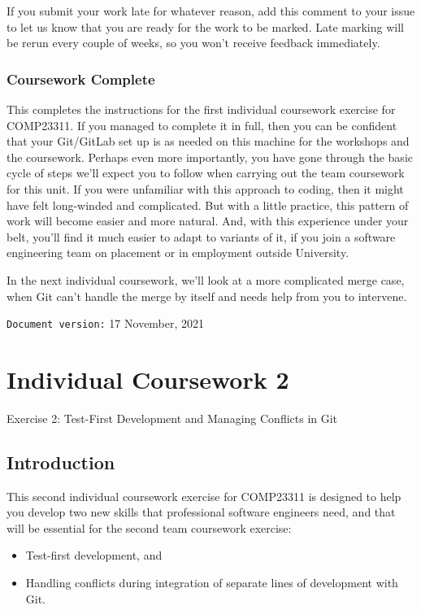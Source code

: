 \documentclass[
]{book}
\providecommand{\tightlist}{%
  \setlength{\itemsep}{0pt}\setlength{\parskip}{0pt}}
\begin{document}
If you submit your work late for whatever reason, add this comment to your issue to let us know that you are ready for the work to be marked. Late marking will be rerun every couple of weeks, so you won't receive feedback immediately.

\hypertarget{gameover}{%
\subsection{Coursework Complete}\label{gameover}}

This completes the instructions for the first individual coursework exercise for COMP23311. If you managed to complete it in full, then you can be confident that your Git/GitLab set up is as needed on this machine for the workshops and the coursework. Perhaps even more importantly, you have gone through the basic cycle of steps we'll expect you to follow when carrying out the team coursework for this unit. If you were unfamiliar with this approach to coding, then it might have felt long-winded and complicated. But with a little practice, this pattern of work will become easier and more natural. And, with this experience under your belt, you'll find it much easier to adapt to variants of it, if you join a software engineering team on placement or in employment outside University.

In the next individual coursework, we'll look at a more complicated merge case, when Git can't handle the merge by itself and needs help from you to intervene.

\texttt{Document\ version:} 17 November, 2021

\hypertarget{conflicting}{%
\chapter{Individual Coursework 2}\label{conflicting}}

Exercise 2: Test-First Development and Managing Conflicts in Git

\hypertarget{introt}{%
\section{Introduction}\label{introt}}

This second individual coursework exercise for COMP23311 is designed to help you develop two new skills that professional software engineers need, and that will be essential for the second team coursework exercise:

\begin{itemize}
\tightlist
\item
  Test-first development, and
\item
  Handling conflicts during integration of separate lines of development with Git.
\end{itemize}
\end{document}

